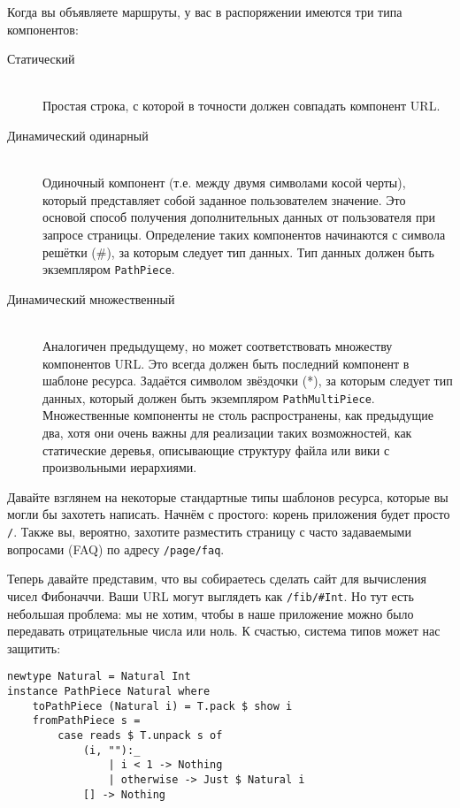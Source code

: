 Когда вы объявляете маршруты, у вас в распоряжении имеются три типа компонентов:
\begin{description}
\item[Статический] \hfill \\
  Простая строка, с которой в точности должен совпадать компонент URL.

\item[Динамический одинарный] \hfill \\
  Одиночный компонент (т.е. между двумя символами косой черты), который
  представляет собой заданное пользователем значение. Это основой способ получения
  дополнительных данных от пользователя при запросе страницы. Определение таких
  компонентов начинаются с символа решётки (\#), за которым следует тип данных. Тип данных
  должен быть экземпляром \lstinline!PathPiece!.

\item[Динамический множественный] \hfill \\
  Аналогичен предыдущему, но может соответствовать множеству компонентов URL. Это всегда должен
  быть последний компонент в шаблоне ресурса. Задаётся символом звёздочки (*), за которым
  следует тип данных, который должен быть экземпляром
  \lstinline!PathMultiPiece!. Множественные компоненты не столь распространены, как
  предыдущие два, хотя они очень важны для реализации таких возможностей, как статические
  деревья, описывающие структуру файла или вики с произвольными иерархиями.
\end{description}

Давайте взглянем на некоторые стандартные типы шаблонов ресурса, которые вы могли бы
захотеть написать. Начнём с простого: корень приложения будет просто \lstinline!/!. Также
вы, вероятно, захотите разместить страницу с часто задаваемыми вопросами (FAQ) по адресу
\lstinline!/page/faq!.

Теперь давайте представим, что вы собираетесь сделать сайт для вычисления чисел
Фибоначчи. Ваши URL могут выглядеть как \lstinline!/fib/#Int!. Но тут есть
небольшая проблема: мы не хотим, чтобы в наше приложение можно было передавать
отрицательные числа или ноль. К счастью, система типов может нас защитить:
\begin{lstlisting}
newtype Natural = Natural Int
instance PathPiece Natural where
    toPathPiece (Natural i) = T.pack $ show i
    fromPathPiece s =
        case reads $ T.unpack s of
            (i, ""):_
                | i < 1 -> Nothing
                | otherwise -> Just $ Natural i
            [] -> Nothing
\end{lstlisting}%

